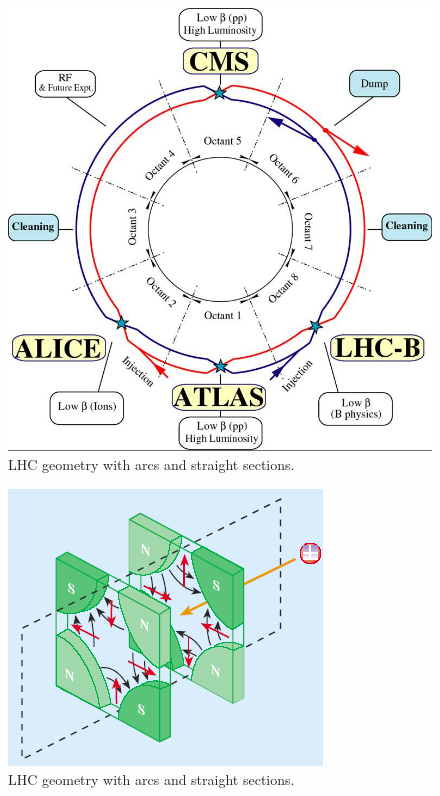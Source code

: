 \begin{figure}[h]
  \begin{center}
  \includegraphics[scale=0.8]{figures/LHC/lhc-schematic.jpg}
  \caption{LHC geometry with arcs and straight sections. }
  \label{fig:LHCgeometry}
  \end{center}
\end{figure}


\begin{figure}[h]
  \begin{center}
  \includegraphics[scale=1.0]{figures/LHC/quadrupole_magnet_pair.png}
  \caption{LHC geometry with arcs and straight sections. }
  \label{fig:QuadrupoleMagnet}
  \end{center}
\end{figure}

